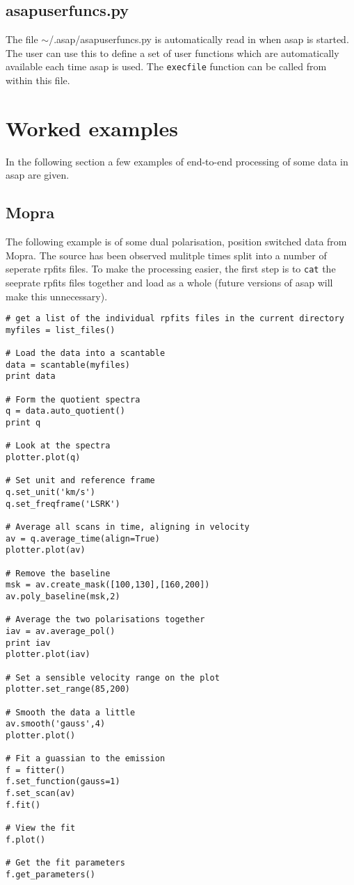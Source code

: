 \documentclass[11pt]{article}
\newcommand{\cmd}[1]{{\tt #1}}
\begin{document}
\subsection{asapuserfuncs.py}

The file $\sim$/.asap/asapuserfuncs.py is automatically read in when
asap is started. The user can use this to define a set of user
functions which are automatically available each time asap is
used. The \cmd{execfile} function can be called from within this file.

\section{Worked examples}

In the following section a few examples of end-to-end processing of
some data in asap are given.

\subsection{Mopra}

The following example is of some dual polarisation, position switched
data from Mopra. The source has been observed mulitple times split
into a number of seperate rpfits files. To make the processing easier,
the first step is to \cmd{cat} the seeprate rpfits files together and
load as a whole (future versions of asap will make this unnecessary).


\begin{verbatim}
# get a list of the individual rpfits files in the current directory
myfiles = list_files()

# Load the data into a scantable
data = scantable(myfiles)
print data

# Form the quotient spectra
q = data.auto_quotient()
print q

# Look at the spectra
plotter.plot(q)

# Set unit and reference frame
q.set_unit('km/s')
q.set_freqframe('LSRK')

# Average all scans in time, aligning in velocity
av = q.average_time(align=True)
plotter.plot(av)

# Remove the baseline
msk = av.create_mask([100,130],[160,200])
av.poly_baseline(msk,2)

# Average the two polarisations together
iav = av.average_pol()
print iav
plotter.plot(iav)

# Set a sensible velocity range on the plot
plotter.set_range(85,200)

# Smooth the data a little
av.smooth('gauss',4)
plotter.plot()

# Fit a guassian to the emission
f = fitter()
f.set_function(gauss=1)
f.set_scan(av)
f.fit()

# View the fit
f.plot()

# Get the fit parameters
f.get_parameters()

\end{verbatim}
\end{document}
